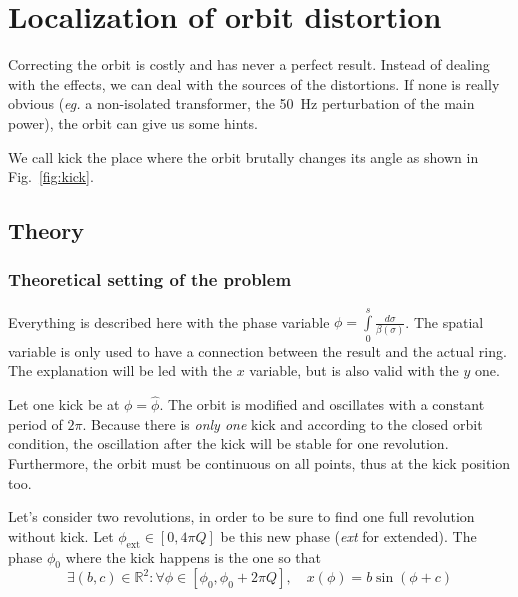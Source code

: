 
\section{Localization of orbit distortion}
\label{sec:localisation}

Correcting the orbit is costly and has never a perfect result. Instead of dealing with the effects, we can deal with the sources of the distortions. If none is really obvious (\textit{eg.} a non-isolated transformer, the 50~Hz perturbation of the main power), the orbit can give us some hints.

We call kick the place where the orbit brutally changes its angle as shown in Fig.~\ref{fig:kick}.


\subsection{Theory}
\label{ssec:loc_theory}

\subsubsection{Theoretical setting of the problem}

Everything is described here with the phase variable $\phi = \int\limits_{0}^s \frac{d\sigma}{\beta(\sigma)}$. The spatial variable is only used to have a connection between the result and the actual ring. The explanation will be led with the $x$ variable, but is also valid with the $y$ one.

Let one kick be at $\phi = \hat{\phi}$. The orbit is modified and oscillates with a constant period of $2 \pi$. Because there is {\em only one} kick and according to the closed orbit condition, the oscillation after the kick will be stable for one revolution. Furthermore, the orbit must be continuous on all points, thus at the kick position too.

Let's consider two revolutions, in order to be sure to find one full revolution without kick. Let $\phi_\mathrm{ext} \in [0, 4 \pi Q]$ be this new phase (\textit{ext} for extended). The phase $\phi_0$ where the kick happens is the one so that 
\begin{equation}
\exists (b, c) \in \mathbb{R}^2:
\forall \phi \in [\phi_0, \phi_0 + 2 \pi Q], \quad
x(\phi) = b \sin(\phi + c)
\end{equation}


